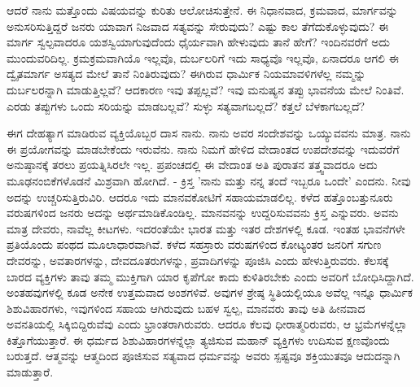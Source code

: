 ಆದರೆ ನಾನು ಮತ್ತೊಂದು ವಿಷಯವನ್ನು ಕುರಿತು ಆಲೋಚಿಸುತ್ತೇನೆ. ಈ ನಿಧಾನವಾದ, ಕ್ರಮವಾದ, ಮಾರ್ಗವನ್ನು ಅನುಸರಿಸುತ್ತಿದ್ದರೆ ಜನರು ಯಾವಾಗ ನಿಜವಾದ ಸತ್ಯವನ್ನು ಸೇರುವುದು? ಎಷ್ಟು ಕಾಲ ತೆಗೆದುಕೊಳ್ಳುವುದು? ಈ ಮಾರ್ಗ ಸ್ವಲ್ಪವಾದರೂ ಯಶಸ್ವಿಯಾಗುವುದೆಂದು ಧೈರ್ಯವಾಗಿ ಹೇಳುವುದು ತಾನೆ ಹೇಗೆ? ಇಂದಿನವರೆಗೆ ಅದು ಮುಂದುವರಿದಿಲ್ಲ. ಕ್ರಮಕ್ರಮವಾಗಿಯೊ ಇಲ್ಲವೊ, ದುರ್ಬಲರಿಗೆ ಇದು ಸಾಧ್ಯವೊ ಇಲ್ಲವೊ, ಏನಾದರೂ ಆಗಲಿ ಈ ದ್ವೈತಮಾರ್ಗ ಅಸತ್ಯದ ಮೇಲೆ ತಾನೆ ನಿಂತಿರುವುದು? ಈಗಿರುವ ಧಾರ್ಮಿಕ ನಿಯಮಾವಳಿಗಳೆಲ್ಲ ನಮ್ಮನ್ನು ದುರ್ಬಲರನ್ನಾಗಿ ಮಾಡುತ್ತಿಲ್ಲವೆ? ಆದಕಾರಣ ಇವು ತಪ್ಪಲ್ಲವೆ? ಇವು ಮನುಷ್ಯನ ತಪ್ಪು ಭಾವನೆಯ ಮೇಲೆ ನಿಂತಿವೆ. ಎರಡು ತಪ್ಪುಗಳು ಒಂದು ಸರಿಯನ್ನು ಮಾಡಬಲ್ಲವೆ? ಸುಳ್ಳು ಸತ್ಯವಾಗಬಲ್ಲದೆ? ಕತ್ತಲೆ ಬೆಳಕಾಗಬಲ್ಲದೆ?

ಈಗ ದೇಹತ್ಯಾಗ ಮಾಡಿರುವ ವ್ಯಕ್ತಿಯೊಬ್ಬರ ದಾಸ ನಾನು. ನಾನು ಅವರ ಸಂದೇಶವನ್ನು ಒಯ್ಯುವವನು ಮಾತ್ರ. ನಾನು ಈ ಪ್ರಯೋಗವನ್ನು ಮಾಡಬೇಕೆಂದು ಇರುವೆನು. ನಾನು ನಿಮಗೆ ಹೇಳಿದ ವೇದಾಂತದ ಉಪದೇಶವನ್ನು ಇದುವರೆಗೆ ಅನುಷ್ಠಾನಕ್ಕೆ ತರಲು ಪ್ರಯತ್ನಿಸಿರಲೇ ಇಲ್ಲ. ಪ್ರಪಂಚದಲ್ಲಿ ಈ ವೇದಾಂತ ಅತಿ ಪುರಾತನ ತತ್ತ್ವವಾದರೂ ಅದು ಮೂಢನಂಬಿಕೆಗಳೊಡನೆ ಮಿಶ್ರವಾಗಿ ಹೋಗಿದೆ. - ಕ್ರಿಸ್ತ 'ನಾನು ಮತ್ತು ನನ್ನ ತಂದೆ ಇಬ್ಬರೂ ಒಂದೇ' ಎಂದನು. ನೀವು ಅದನ್ನು ಉಚ್ಚರಿಸುತ್ತಿರುವಿರಿ. ಆದರೂ ಇದು ಮಾನವಕೋಟಿಗೆ ಸಹಾಯಮಾಡಲಿಲ್ಲ. ಕಳೆದ ಹತ್ತೊಂಬತ್ತುನೂರು ವರುಷಗಳಿಂದ ಜನರು ಅದನ್ನು ಅರ್ಥಮಾಡಿಕೊಂಡಿಲ್ಲ. ಮಾನವನನ್ನು ಉದ್ದರಿಸುವವನು ಕ್ರಿಸ್ತ ಎನ್ನುವರು. ಅವನು ಮಾತ್ರ ದೇವರು, ನಾವೆಲ್ಲ ಕೀಟಗಳು. ಇದರಂತೆಯೇ ಭಾರತ ಮತ್ತು ಇತರ ದೇಶಗಳಲ್ಲಿ ಕೂಡ. ಇಂತಹ ಭಾವನೆಗಳೇ ಪ್ರತಿಯೊಂದು ಪಂಥದ ಮೂಲಾಧಾರವಾಗಿವೆ. ಕಳೆದ ಸಹಸ್ರಾರು ವರುಷಗಳಿಂದ ಕೋಟ್ಯಂತರ ಜನರಿಗೆ ಸಗುಣ ದೇವರನ್ನು, ಅವತಾರಗಳನ್ನು, ದೇವದೂತರುಗಳನ್ನು, ಪ್ರವಾದಿಗಳನ್ನು ಪೂಜಿಸಿ ಎಂದು ಹೇಳುತ್ತಿರುವರು. ಕೆಲಸಕ್ಕೆ ಬಾರದ ವ್ಯಕ್ತಿಗಳು ತಾವು ತಮ್ಮ ಮುಕ್ತಿಗಾಗಿ ಯಾರ ಕೃಪೆಗೋ ಕಾದು ಕುಳಿತಿರಬೇಕು ಎಂದು ಅವರಿಗೆ ಬೋಧಿಸಿದ್ದಾಗಿದೆ. ಅಂತಹವುಗಳಲ್ಲಿ ಕೂಡ ಅನೇಕ ಉತ್ತಮವಾದ ಅಂಶಗಳಿವೆ. ಅವುಗಳ ಶ್ರೇಷ್ಠ ಸ್ಥಿತಿಯಲ್ಲಿಯೂ ಅವೆಲ್ಲ ಇನ್ನೂ ಧಾರ್ಮಿಕ ಶಿಶುವಿಹಾರಗಳು, ಇವುಗಳಿಂದ ಸಹಾಯ ಆಗಿರುವುದು ಬಹಳ ಸ್ವಲ್ಪ, ಮಾನವರು ತಾವು ಅತಿ ಹೀನವಾದ ಅವನತಿಯಲ್ಲಿ ಸಿಕ್ಕಿಬಿದ್ದಿರುವೆವು ಎಂದು ಭ್ರಾಂತರಾಗಿರುವರು. ಆದರೂ ಕೆಲವು ಧೀರಾತ್ಮರಿರುವರು, ಆ ಭ್ರಮೆಗಳನ್ನೆಲ್ಲಾ ಕಿತ್ತೊಗೆಯುತ್ತಾರೆ. ಈ ಧರ್ಮದ ಶಿಶುವಿಹಾರಗಳನ್ನೆಲ್ಲಾ ತ್ಯಜಿಸುವ ಮಹಾನ್ ವ್ಯಕ್ತಿಗಳು ಉದಿಸುವ ಕ್ಷಣವೊಂದು ಬರುತ್ತದೆ. ಆತ್ಮವನ್ನು ಆತ್ಮದಿಂದ ಪೂಜಿಸುವ ಸತ್ಯವಾದ ಧರ್ಮವನ್ನು ಅವರು ಸ್ಪಷ್ಟವೂ ಶಕ್ತಿಯುತವೂ ಆದುದನ್ನಾಗಿ ಮಾಡುತ್ತಾರೆ.

